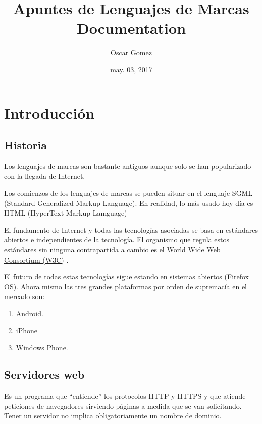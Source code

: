 \documentclass[letterpaper,10pt,spanish]{sphinxmanual}
\title{Apuntes de Lenguajes de Marcas Documentation}
\date{may. 03, 2017}
\author{Oscar Gomez}
\begin{document}
\maketitle
\tableofcontents
{}\label{index::doc}



\chapter{Introducción}
\label{tema1:introduccion}\label{tema1::doc}\label{tema1:apuntes-de-lenguajes-de-marcas}

\section{Historia}
\label{tema1:historia}
Los lenguajes de marcas son bastante antiguos aunque solo se han popularizado con la llegada de Internet.

Los comienzos de los lenguajes de marcas se pueden situar en el lenguaje SGML (Standard Generalized Markup Language). En realidad, lo más usado hoy día es HTML (HyperText Markup Lamguage)

El fundamento de Internet y todas las tecnologías asociadas se basa en estándares abiertos e
independientes de la tecnología. El organismo que regula estos estándares sin ninguna contrapartida a cambio es el \href{http://www.w3c.org}{World Wide Web Consortium (W3C)} .

El futuro de todas estas tecnologías sigue estando en sistemas abiertos (Firefox OS). Ahora mismo las tres grandes plataformas por orden de supremacía en el mercado son:
\begin{enumerate}
\item {} 
Android.

\item {} 
iPhone

\item {} 
Windows Phone.

\end{enumerate}


\section{Servidores web}
\label{tema1:servidores-web}
Es un programa que “entiende” los protocolos HTTP y HTTPS y que atiende peticiones de navegadores
sirviendo páginas a medida que se van solicitando. Tener un servidor no implica obligatoriamente un nombre de dominio.
\end{document}
